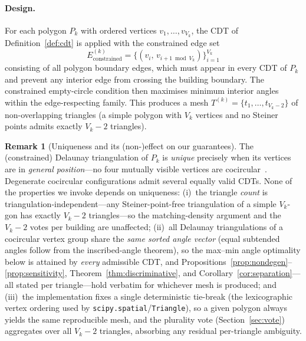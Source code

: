 \documentclass[10pt]{article}
\theoremstyle{plain}
\theoremstyle{definition}
\newtheorem{remark}[theorem]{Remark}
\begin{document}
\paragraph{Design.}
For each polygon $P_k$ with ordered vertices $v_1,\ldots,v_{V_k}$, the CDT of
Definition~\ref{def:cdt} is applied with the constrained edge set
\begin{equation}
E_{\mathrm{constrained}}^{(k)}
= \bigl\{(v_i,\,v_{i+1 \bmod V_k})\bigr\}_{i=1}^{V_k}
\label{eq:cdt_edges}
\end{equation}
consisting of all polygon boundary edges, which must appear in every CDT
of $P_k$ and prevent any interior edge from crossing the building boundary.
The constrained empty-circle condition then maximises minimum interior angles
within the edge-respecting family.
This produces a mesh $T^{(k)} = \{t_1,\ldots,t_{V_k-2}\}$ of
non-overlapping triangles (a simple polygon with $V_k$ vertices and no Steiner
points admits exactly $V_k-2$ triangles).

\begin{remark}[Uniqueness and its (non-)effect on our guarantees]
\label{rem:cdt_unique}
The (constrained) Delaunay triangulation of $P_k$ is \emph{unique} precisely
when its vertices are in \emph{general position}---no four mutually visible
vertices are cocircular~\cite{de1997computational}. Degenerate cocircular
configurations admit several equally valid CDTs. None of the properties we
invoke depends on uniqueness:
(i)~the triangle \emph{count} is triangulation-independent---any
Steiner-point-free triangulation of a simple $V_k$-gon has exactly $V_k-2$
triangles---so the matching-density argument and the $V_k-2$ votes per building
are unaffected;
(ii)~all Delaunay triangulations of a cocircular vertex group share the
\emph{same sorted angle vector} (equal subtended angles follow from the
inscribed-angle theorem), so the max--min angle optimality below is attained by
\emph{every} admissible CDT, and Propositions~\ref{prop:nondegen}--\ref{prop:sensitivity},
Theorem~\ref{thm:discriminative}, and Corollary~\ref{cor:separation}---all
stated per triangle---hold verbatim for whichever mesh is produced; and
(iii)~the implementation fixes a single deterministic tie-break (the
lexicographic vertex ordering used by \texttt{scipy.spatial}/\texttt{Triangle}),
so a given polygon always yields the same reproducible mesh, and the
plurality vote (Section~\ref{sec:vote}) aggregates over all $V_k-2$ triangles,
absorbing any residual per-triangle ambiguity.
\end{remark}
\end{document}

